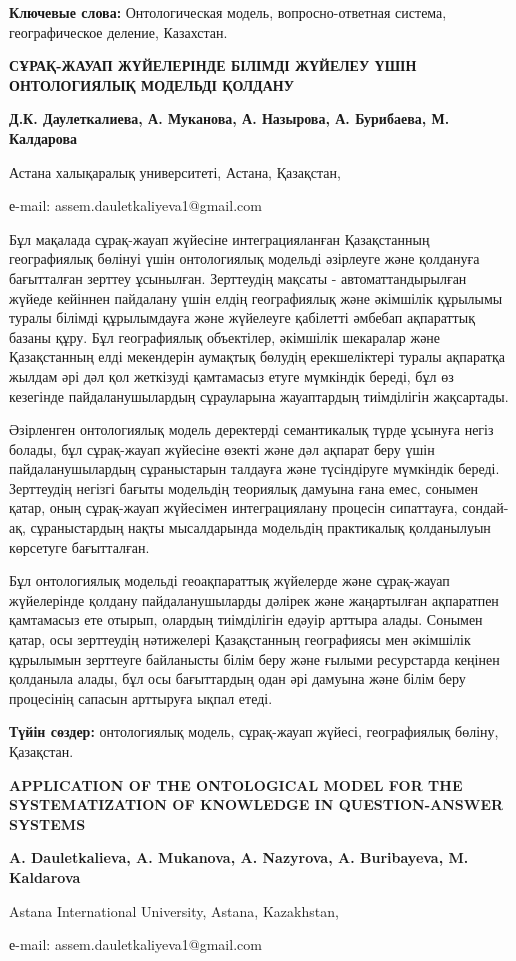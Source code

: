 {\bfseries Ключевые слова:} Онтологическая модель, вопросно-ответная
система, географическое деление, Казахстан.

\begin{center}
{\large\bfseries СҰРАҚ-ЖАУАП ЖҮЙЕЛЕРІНДЕ БІЛІМДІ ЖҮЙЕЛЕУ ҮШІН ОНТОЛОГИЯЛЫҚ МОДЕЛЬДІ ҚОЛДАНУ}

{\bfseries Д.К. Даулеткалиева\envelope, А. Муканова, А. Назырова, А. Бурибаева, М. Калдарова}

Астана халықаралық университеті, Астана, Қазақстан,

е-mail: assem.dauletkaliyeva1@gmail.com
\end{center}

Бұл мақалада сұрақ-жауап жүйесіне интеграцияланған Қазақстанның
географиялық бөлінуі үшін онтологиялық модельді әзірлеуге және қолдануға
бағытталған зерттеу ұсынылған. Зерттеудің мақсаты - автоматтандырылған
жүйеде кейіннен пайдалану үшін елдің географиялық және әкімшілік
құрылымы туралы білімді құрылымдауға және жүйелеуге қабілетті әмбебап
ақпараттық базаны құру. Бұл географиялық объектілер, әкімшілік шекаралар
және Қазақстанның елді мекендерін аумақтық бөлудің ерекшеліктері туралы
ақпаратқа жылдам әрі дәл қол жеткізуді қамтамасыз етуге мүмкіндік
береді, бұл өз кезегінде пайдаланушылардың сұрауларына жауаптардың
тиімділігін жақсартады.

Әзірленген онтологиялық модель деректерді семантикалық түрде ұсынуға
негіз болады, бұл сұрақ-жауап жүйесіне өзекті және дәл ақпарат беру үшін
пайдаланушылардың сұраныстарын талдауға және түсіндіруге мүмкіндік
береді. Зерттеудің негізгі бағыты модельдің теориялық дамуына ғана емес,
сонымен қатар, оның сұрақ-жауап жүйесімен интеграциялану процесін
сипаттауға, сондай-ақ, сұраныстардың нақты мысалдарында модельдің
практикалық қолданылуын көрсетуге бағытталған.

Бұл онтологиялық модельді геоақпараттық жүйелерде және сұрақ-жауап
жүйелерінде қолдану пайдаланушыларды дәлірек және жаңартылған ақпаратпен
қамтамасыз ете отырып, олардың тиімділігін едәуір арттыра алады. Сонымен
қатар, осы зерттеудің нәтижелері Қазақстанның географиясы мен әкімшілік
құрылымын зерттеуге байланысты білім беру және ғылыми ресурстарда
кеңінен қолданыла алады, бұл осы бағыттардың одан әрі дамуына және білім
беру процесінің сапасын арттыруға ықпал етеді.

{\bfseries Түйін сөздер:} онтологиялық модель, сұрақ-жауап жүйесі,
географиялық бөліну, Қазақстан.

\begin{center}
{\large\bfseries APPLICATION OF THE ONTOLOGICAL MODEL FOR THE SYSTEMATIZATION OF
KNOWLEDGE IN QUESTION-ANSWER SYSTEMS}

{\bfseries A. Dauletkalieva\envelope, A. Mukanova, A. Nazyrova, A. Buribayeva, M.
Kaldarova}

Astana International University, Astana, Kazakhstan,

е-mail: assem.dauletkaliyeva1@gmail.com
\end{center}

